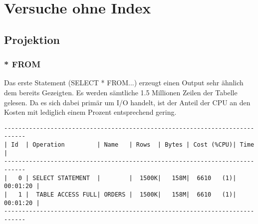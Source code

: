 \documentclass[11pt,a4paper,parskip=half]{scrartcl}
\begin{document}
\section{Versuche ohne Index}
\subsection{Projektion}
\subsubsection{* FROM}
\label{no-idx-pro-all}
Das erste Statement (SELECT * FROM...) erzeugt einen Output sehr ähnlich dem bereits Gezeigten. Es werden sämtliche 1.5 Millionen Zeilen der Tabelle gelesen. Da es sich dabei primär um I/O handelt, ist der Anteil der CPU an den Kosten mit lediglich einem Prozent entsprechend gering.
\begin{lstlisting}
----------------------------------------------------------------------------                                                                                                                                                                                                                                 
| Id  | Operation         | Name   | Rows  | Bytes | Cost (%CPU)| Time     |                                                                                                                                                                                                                                 
----------------------------------------------------------------------------                                                                                                                                                                                                                                 
|   0 | SELECT STATEMENT  |        |  1500K|   158M|  6610   (1)| 00:01:20 |                                                                                                                                                                                                                                 
|   1 |  TABLE ACCESS FULL| ORDERS |  1500K|   158M|  6610   (1)| 00:01:20 |                                                                                                                                                                                                                                 
---------------------------------------------------------------------------- 
\end{lstlisting}
\end{document}
